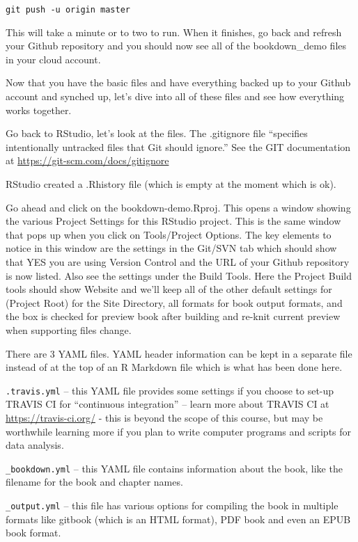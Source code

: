 \documentclass[
]{book}
\begin{document}
\texttt{git\ push\ -u\ origin\ master}

This will take a minute or to two to run. When it finishes, go back and refresh your Github repository and you should now see all of the bookdown\_demo files in your cloud account.

Now that you have the basic files and have everything backed up to your Github account and synched up, let's dive into all of these files and see how everything works together.

Go back to RStudio, let's look at the files. The .gitignore file ``specifies intentionally untracked files that Git should ignore.'' See the GIT documentation at \url{https://git-scm.com/docs/gitignore}

RStudio created a .Rhistory file (which is empty at the moment which is ok).

Go ahead and click on the bookdown-demo.Rproj. This opens a window showing the various Project Settings for this RStudio project. This is the same window that pops up when you click on Tools/Project Options. The key elements to notice in this window are the settings in the Git/SVN tab which should show that YES you are using Version Control and the URL of your Github repository is now listed. Also see the settings under the Build Tools. Here the Project Build tools should show Website and we'll keep all of the other default settings for (Project Root) for the Site Directory, all formats for book output formats, and the box is checked for preview book after building and re-knit current preview when supporting files change.

There are 3 YAML files. YAML header information can be kept in a separate file instead of at the top of an R Markdown file which is what has been done here.

\texttt{.travis.yml} -- this YAML file provides some settings if you choose to set-up TRAVIS CI for ``continuous integration'' -- learn more about TRAVIS CI at \url{https://travis-ci.org/} - this is beyond the scope of this course, but may be worthwhile learning more if you plan to write computer programs and scripts for data analysis.

\texttt{\_bookdown.yml} -- this YAML file contains information about the book, like the filename for the book and chapter names.

\texttt{\_output.yml} -- this file has various options for compiling the book in multiple formats like gitbook (which is an HTML format), PDF book and even an EPUB book format.
\end{document}
